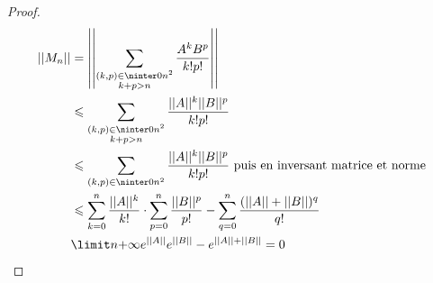 \begin{proof}
    \begin{align*}
        ||M_n|| & = \left|\left| \sum_{\substack{(k, p) \in \ninter 0 n^2 \\ k + p > n}} \frac{A^k B^p}{k! p!} \right|\right| \\
                & \leqslant \sum_{\substack{(k, p) \in \ninter 0 n^2 \\ k + p > n}} \frac{||A||^k ||B||^p}{k! p!} \\
                & \leqslant \sum_{(k, p) \in \ninter 0 n^2} \frac{||A||^k ||B||^p}{k! p!} \text{ puis en inversant matrice et norme } \\
                & \leqslant \sum_{k = 0 }^{n} \frac{||A||^k}{k!} \cdot \sum_{p = 0 }^{n } \frac{||B||^p}{p!} - \sum_{q = 0}^n  \frac{(||A || + ||B||)^q}{q!} \\
                & \limit n {+ \infty} e^{||A||} e^{||B||} - e^{||A|| + ||B||} = 0
    \end{align*}
\end{proof}